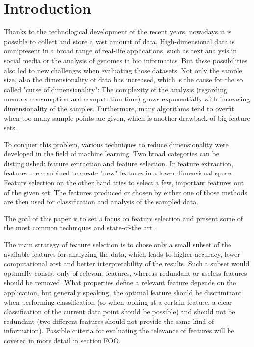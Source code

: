 \section{Introduction}
\label{sec:introduction}


Thanks to the technological development of the recent years, nowadays it is possible to collect and store a vast amount of data. High-dimensional data is omnipresent in a broad range of real-life applications, such as text analysis in social media or the analysis of genomes in bio informatics. But these possibilities also led to new challenges when evaluating those datasets. Not only the sample size, also the dimensionality of data has increased, which is the cause for the so called "curse of dimensionality": The complexity of the analysis (regarding memory consumption and computation time) grows exponentially with increasing dimensionality of the samples. Furthermore, many algorithms tend to overfit when too many sample points are given, which is another drawback of big feature sets. \cite{Verikas:02}

To conquer this problem, various techniques to reduce dimensionality were developed in the field of machine learning. Two broad categories can be distinguished: feature extraction and feature selection. 
In feature extraction, features are combined to create "new" features in a lower dimensional space. Feature selection on the other hand tries to select a few, important features out of the given set.
The features produced or chosen by either one of those methods are then used for classification and analysis of the sampled data. 

The goal of this paper is to set a focus on feature selection and present some of the most common techniques and state-of-the art.

The main strategy of feature selection is to chose only a small subset of the available features for analyzing the data, which leads to higher accuracy, lower computational cost and better interpretability of the results.\cite{Tang:14} Such a subset would optimally consist only of relevant features, whereas redundant or useless features should be removed. What properties define a relevant feature depends on the application, but generally speaking, the optimal feature should be discriminant when performing classification (so when looking at a certain feature, a clear classification of the current data point should be possible)
and should not be redundant (two different features should not provide the same kind of information). Possible criteria for evaluating the relevance of features will be covered in more detail in section FOO.

